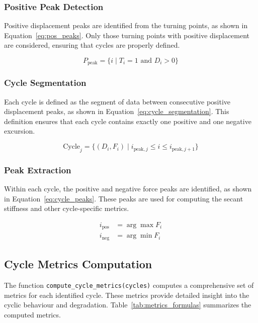 \documentclass[11pt,a4paper]{article}
\begin{document}
\subsubsection{Positive Peak Detection}

Positive displacement peaks are identified from the turning points, as shown in Equation~\ref{eq:pos_peaks}. Only those turning points with positive displacement are considered, ensuring that cycles are properly defined.

\begin{equation}
P_{\text{peak}} = \{ i \mid T_i = 1 \text{ and } D_i > 0 \}
\label{eq:pos_peaks}
\end{equation}

\subsubsection{Cycle Segmentation}

Each cycle is defined as the segment of data between consecutive positive displacement peaks, as shown in Equation~\ref{eq:cycle_segmentation}. This definition ensures that each cycle contains exactly one positive and one negative excursion.

\begin{equation}
\text{Cycle}_j = \{ (D_i, F_i) \mid i_{\text{peak},j} \le i \le i_{\text{peak},j+1} \}
\label{eq:cycle_segmentation}
\end{equation}

\subsubsection{Peak Extraction}

Within each cycle, the positive and negative force peaks are identified, as shown in Equation~\ref{eq:cycle_peaks}. These peaks are used for computing the secant stiffness and other cycle-specific metrics.

\begin{align}
i_{\text{pos}} &= \arg\max F_i \\
i_{\text{neg}} &= \arg\min F_i
\label{eq:cycle_peaks}
\end{align}

\subsection{Cycle Metrics Computation}

The function \texttt{compute\_cycle\_metrics(cycles)} computes a comprehensive set of metrics for each identified cycle. These metrics provide detailed insight into the cyclic behaviour and degradation. Table~\ref{tab:metrics_formulas} summarizes the computed metrics.
\end{document}
